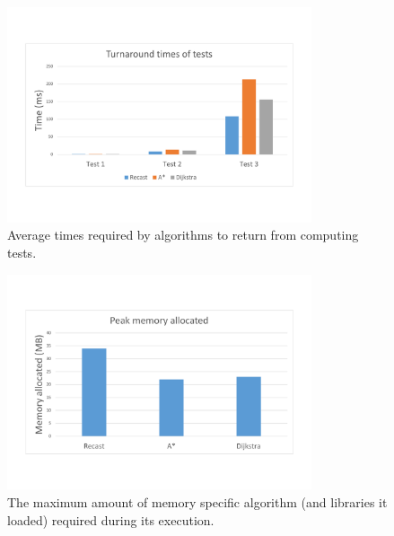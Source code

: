 \documentclass[main.tex]{subfiles}
\begin{document}
\begin{figure}[H]
\center
\includegraphics[trim=0 0 0 0, clip,width=0.8\textwidth,height=\textheight,keepaspectratio]{images/algoTurnaroundTimes.pdf}
\caption{Average times required by algorithms to return from computing tests.}
\label{fig:algoTurnaround}
\end{figure}

\begin{figure}[H]
\center
\includegraphics[trim=0 0 0 0, clip,width=0.8\textwidth,height=\textheight,keepaspectratio]{images/algoMemoryAlloc.pdf}
\caption{The maximum amount of memory specific algorithm (and libraries it loaded) required during its execution.}
\label{fig:algoMemAlloc}
\end{figure}
\end{document}
